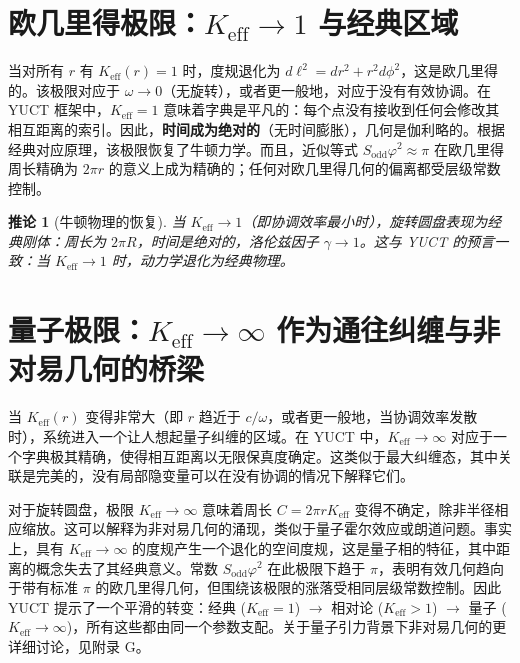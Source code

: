 \documentclass[12pt,a4paper]{article}
\newtheorem{corollary}{推论}[section]
\newcommand{\Sodd}{S_{\mathrm{odd}}}
\begin{document}
	\section{欧几里得极限：\(K_{\mathrm{eff}} \to 1\) 与经典区域}
	\label{sec:euc-limit}
	
	当对所有 \(r\) 有 \(K_{\mathrm{eff}}(r) = 1\) 时，度规退化为 \(d\ell^2 = dr^2 + r^2 d\phi^2\)，这是欧几里得的。该极限对应于 \(\omega \to 0\)（无旋转），或者更一般地，对应于没有有效协调。在 YUCT 框架中，\(K_{\mathrm{eff}} = 1\) 意味着字典是平凡的：每个点没有接收到任何会修改其相互距离的索引。因此，\textbf{时间成为绝对的}（无时间膨胀），几何是伽利略的。根据经典对应原理，该极限恢复了牛顿力学。而且，近似等式 \(\Sodd \varphi^2 \approx \pi\) 在欧几里得周长精确为 \(2\pi r\) 的意义上成为精确的；任何对欧几里得几何的偏离都受层级常数控制。
	
	\begin{corollary}[牛顿物理的恢复]
		当 \(K_{\mathrm{eff}} \to 1\)（即协调效率最小时），旋转圆盘表现为经典刚体：周长为 \(2\pi R\)，时间是绝对的，洛伦兹因子 \(\gamma \to 1\)。这与 YUCT 的预言一致：当 \(K_{\mathrm{eff}} \to 1\) 时，动力学退化为经典物理。
	\end{corollary}
	
	\section{量子极限：\(K_{\mathrm{eff}} \to \infty\) 作为通往纠缠与非对易几何的桥梁}
	\label{sec:quantum-limit}
	
	当 \(K_{\mathrm{eff}}(r)\) 变得非常大（即 \(r\) 趋近于 \(c/\omega\)，或者更一般地，当协调效率发散时），系统进入一个让人想起量子纠缠的区域。在 YUCT 中，\(K_{\mathrm{eff}} \to \infty\) 对应于一个字典极其精确，使得相互距离以无限保真度确定。这类似于最大纠缠态，其中关联是完美的，没有局部隐变量可以在没有协调的情况下解释它们。
	
	对于旋转圆盘，极限 \(K_{\mathrm{eff}} \to \infty\) 意味着周长 \(C = 2\pi r K_{\mathrm{eff}}\) 变得不确定，除非半径相应缩放。这可以解释为非对易几何的涌现，类似于量子霍尔效应或朗道问题。事实上，具有 \(K_{\mathrm{eff}} \to \infty\) 的度规产生一个退化的空间度规，这是量子相的特征，其中距离的概念失去了其经典意义。常数 \(\Sodd \varphi^2\) 在此极限下趋于 \(\pi\)，表明有效几何趋向于带有标准 \(\pi\) 的欧几里得几何，但围绕该极限的涨落受相同层级常数控制。因此 YUCT 提示了一个平滑的转变：经典 (\(K_{\mathrm{eff}}=1\)) \(\rightarrow\) 相对论 (\(K_{\mathrm{eff}}>1\)) \(\rightarrow\) 量子 (\(K_{\mathrm{eff}}\to\infty\))，所有这些都由同一个参数支配。关于量子引力背景下非对易几何的更详细讨论，见附录 G。
	
\end{document}
